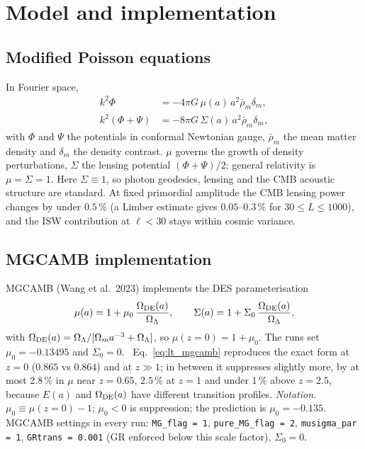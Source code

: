 \section{Model and implementation}
\subsection{Modified Poisson equations}
In Fourier space,
\begin{align}
k^2\Phi&=-4\pi G\,\mu(a)\,a^2\bar\rho_m\delta_m,\\
k^2(\Phi+\Psi)&=-8\pi G\,\Sigma(a)\,a^2\bar\rho_m\delta_m,
\end{align}
with $\Phi$ and $\Psi$ the potentials in conformal Newtonian gauge, $\bar\rho_m$ the mean matter density and $\delta_m$ the density contrast. $\mu$ governs the growth
of density perturbations, $\Sigma$ the lensing potential $(\Phi+\Psi)/2$; general relativity is $\mu=\Sigma=1$. Here $\Sigma\equiv1$, so photon geodesics,
lensing and the CMB acoustic structure are standard. At fixed primordial amplitude the CMB lensing power changes by under $0.5\,\%$ (a Limber estimate gives
$0.05$--$0.3\,\%$ for $30\le L\le1000$), and the ISW contribution at $\ell<30$ stays within cosmic variance.

\subsection{MGCAMB implementation}
MGCAMB (Wang et al.\ 2023) implements the DES parameterisation
\begin{equation}
\mu(a)=1+\mu_0\,\frac{\Omega_{\rm DE}(a)}{\Omega_\Lambda},\qquad\Sigma(a)=1+\Sigma_0\,\frac{\Omega_{\rm DE}(a)}{\Omega_\Lambda},
\label{eq:lt_mgcamb}\end{equation}
with $\Omega_{\rm DE}(a)=\Omega_\Lambda/[\Omega_ma^{-3}+\Omega_\Lambda]$, so $\mu(z{=}0)=1+\mu_0$. The runs set $\mu_0=-0.13495$ and $\Sigma_0=0$.
\calc\ Eq.~\eqref{eq:lt_mgcamb} reproduces the exact form at $z=0$ ($0.865$ vs $0.864$) and at $z\gg1$; in between it suppresses slightly more, by at most
$2.8\,\%$ in $\mu$ near $z=0.65$, $2.5\,\%$ at $z=1$ and under $1\,\%$ above $z=2.5$, because $E(a)$ and $\Omega_{\rm DE}(a)$ have different transition profiles.
\emph{Notation.} $\mu_0\equiv\mu(z{=}0)-1$; $\mu_0<0$ is suppression; the prediction is $\mu_0=-0.135$.
MGCAMB settings in every run: \texttt{MG\_flag = 1}, \texttt{pure\_MG\_flag = 2}, \texttt{musigma\_par = 1}, \texttt{GRtrans = 0.001} (GR enforced below this
scale factor), $\Sigma_0=0$.


